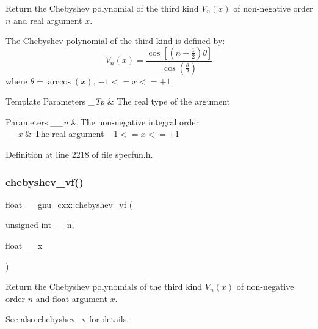 Return the Chebyshev polynomial of the third kind $ V_n(x) $ of non-\/negative order $ n $ and real argument $ x $.

The Chebyshev polynomial of the third kind is defined by\+: \[ V_n(x) = \frac{\cos \left[ \left(n+\frac{1}{2}\right)\theta \right]} {\cos \left(\frac{\theta}{2}\right)} \] where $ \theta = \arccos(x) $, $ -1 <= x <= +1 $.


\begin{DoxyTemplParams}{Template Parameters}
{\em \+\_\+\+Tp} & The real type of the argument \\
\hline
\end{DoxyTemplParams}

\begin{DoxyParams}{Parameters}
{\em \+\_\+\+\_\+n} & The non-\/negative integral order \\
\hline
{\em \+\_\+\+\_\+x} & The real argument $ -1 <= x <= +1 $ \\
\hline
\end{DoxyParams}


Definition at line 2218 of file specfun.\+h.

\mbox{\label{group__gnu__math__spec__func_gaa9635a0da4bdeaa8060ae5cf03c3a12d}} 
\subsubsection{\texorpdfstring{chebyshev\+\_\+vf()}{chebyshev\_vf()}}
{\footnotesize\ttfamily float \+\_\+\+\_\+gnu\+\_\+cxx\+::chebyshev\+\_\+vf (\begin{DoxyParamCaption}\item[{unsigned int}]{\+\_\+\+\_\+n,  }\item[{float}]{\+\_\+\+\_\+x }\end{DoxyParamCaption})\hspace{0.3cm}{\ttfamily [inline]}}

Return the Chebyshev polynomials of the third kind $ V_n(x) $ of non-\/negative order $ n $ and {\ttfamily float} argument $ x $.

\begin{DoxySeeAlso}{See also}
\hyperlink{group__gnu__math__spec__func_ga32b7decd0002f542d2c9187c5f0846c6}{chebyshev\+\_\+v} for details. 
\end{DoxySeeAlso}


